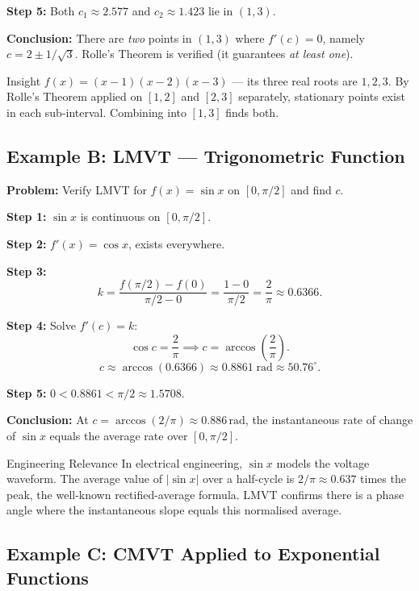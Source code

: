 \documentclass[12pt,a4paper]{article}
\begin{document}
\textbf{Step 5:} Both $c_1 \approx 2.577$ and $c_2 \approx 1.423$ lie in $(1,3)$. \checkmark

\textbf{Conclusion:} There are \emph{two} points in $(1,3)$ where $f'(c)=0$, namely
$c = 2 \pm 1/\sqrt{3}$. Rolle's Theorem is verified (it guarantees \emph{at least one}).

\begin{learnbox}{Insight}
$f(x) = (x-1)(x-2)(x-3)$ --- its three real roots are $1, 2, 3$. By Rolle's Theorem
applied on $[1,2]$ and $[2,3]$ separately, stationary points exist in each sub-interval.
Combining into $[1,3]$ finds both.
\end{learnbox}

\subsection*{Example B: LMVT --- Trigonometric Function}

\noindent\textbf{Problem:} Verify LMVT for $f(x) = \sin x$ on $[0, \pi/2]$ and find $c$.

\medskip
\textbf{Step 1:} $\sin x$ is continuous on $[0, \pi/2]$. \checkmark

\textbf{Step 2:} $f'(x) = \cos x$, exists everywhere. \checkmark

\textbf{Step 3:}
\[
  k = \frac{f(\pi/2) - f(0)}{\pi/2 - 0} = \frac{1 - 0}{\pi/2} = \frac{2}{\pi} \approx 0.6366.
\]

\textbf{Step 4:} Solve $f'(c) = k$:
\[
  \cos c = \frac{2}{\pi} \implies c = \arccos\!\left(\frac{2}{\pi}\right).
\]
\[
  c \approx \arccos(0.6366) \approx 0.8861 \;\text{rad} \approx 50.76^\circ.
\]

\textbf{Step 5:} $0 < 0.8861 < \pi/2 \approx 1.5708$. \checkmark

\textbf{Conclusion:} At $c = \arccos(2/\pi) \approx 0.886\,\text{rad}$, the instantaneous rate
of change of $\sin x$ equals the average rate over $[0, \pi/2]$.

\begin{learnbox}{Engineering Relevance}
In electrical engineering, $\sin x$ models the voltage waveform.
The average value of $|\sin x|$ over a half-cycle is $2/\pi \approx 0.637$ times the peak,
the well-known rectified-average formula. LMVT confirms there is a phase angle where
the instantaneous slope equals this normalised average.
\end{learnbox}

\subsection*{Example C: CMVT Applied to Exponential Functions}
\end{document}
